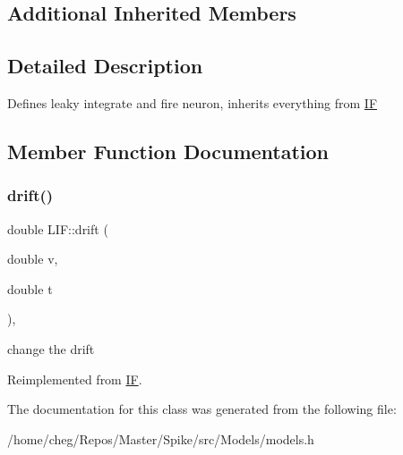 \subsection*{Additional Inherited Members}


\subsection{Detailed Description}
Defines leaky integrate and fire neuron, inherits everything from \hyperlink{classIF}{IF} 

\subsection{Member Function Documentation}
\mbox{\label{classLIF_aea677a0cf3f943edb7a957479e18d6dc}} 
\subsubsection{\texorpdfstring{drift()}{drift()}}
{\footnotesize\ttfamily double L\+I\+F\+::drift (\begin{DoxyParamCaption}\item[{double}]{v,  }\item[{double}]{t }\end{DoxyParamCaption})\hspace{0.3cm}{\ttfamily [inline]}, {\ttfamily [virtual]}}

change the drift 

Reimplemented from \hyperlink{classIF_a9bbd53df68cb9028bf87cf5273253e91}{IF}.



The documentation for this class was generated from the following file\+:\begin{DoxyCompactItemize}
\item 
/home/cheg/\+Repos/\+Master/\+Spike/src/\+Models/models.\+h\end{DoxyCompactItemize}
